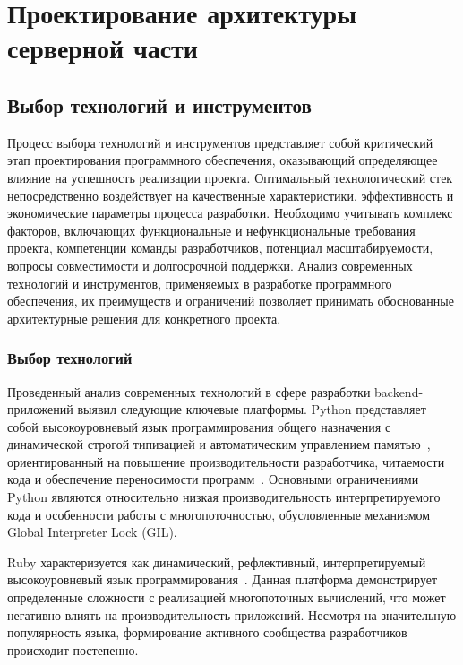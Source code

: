 \section{Проектирование архитектуры серверной части}

\subsection{Выбор технологий и инструментов}

Процесс выбора технологий и инструментов представляет собой критический этап проектирования программного обеспечения, оказывающий определяющее влияние на успешность реализации проекта.
Оптимальный технологический стек непосредственно воздействует на качественные характеристики, эффективность и экономические параметры процесса разработки.
Необходимо учитывать комплекс факторов, включающих функциональные и нефункциональные требования проекта, компетенции команды разработчиков, потенциал масштабируемости, вопросы совместимости и долгосрочной поддержки. Анализ современных технологий и инструментов, применяемых в разработке программного обеспечения, их преимуществ и ограничений позволяет принимать обоснованные архитектурные решения для конкретного проекта.

\subsubsection{Выбор технологий}

Проведенный анализ современных технологий в сфере разработки backend-приложений выявил следующие ключевые платформы.
Python представляет собой высокоуровневый язык программирования общего назначения с динамической строгой типизацией и автоматическим управлением памятью~\cite{9_rana2019}, ориентированный на повышение производительности разработчика, читаемости кода и обеспечение переносимости программ~\cite{10_sirunyan2020}. Основными ограничениями Python являются относительно низкая производительность интерпретируемого кода и особенности работы с многопоточностью, обусловленные механизмом Global Interpreter Lock (GIL).

Ruby характеризуется как динамический, рефлективный, интерпретируемый высокоуровневый язык программирования~\cite{11_roganov2008}. Данная платформа демонстрирует определенные сложности с реализацией многопоточных вычислений, что может негативно влиять на производительность приложений. Несмотря на значительную популярность языка, формирование активного сообщества разработчиков происходит постепенно.

